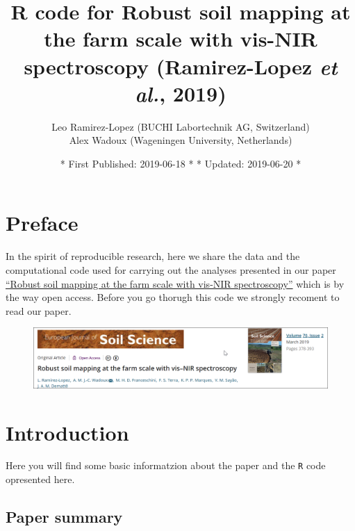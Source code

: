 \documentclass[]{book}
\title{R code for Robust soil mapping at the farm scale with vis-NIR spectroscopy (Ramirez-Lopez \emph{et al.}, 2019)}
\author{Leo Ramirez-Lopez (BUCHI Labortechnik AG, Switzerland) \\ Alex Wadoux (Wageningen University, Netherlands)}
\date{* First Published: 2019-06-18 * * Updated: 2019-06-20 *}
\begin{document}
\maketitle

{
\setcounter{tocdepth}{1}
\tableofcontents
}
\hypertarget{preface}{%
\chapter*{Preface}\label{preface}}

In the spirit of reproducible research, here we share the data and the computational code
used for carrying out the analyses presented in our paper \href{https://onlinelibrary.wiley.com/doi/10.1111/ejss.12752}{``Robust soil mapping at the farm scale with vis-NIR spectroscopy''} which is by the way open access. Before you go thorugh this code we strongly recoment to read our paper.

\begin{figure}
\includegraphics[width=0.9\linewidth]{./maps/paperimg} \end{figure}

\hypertarget{intro}{%
\chapter{Introduction}\label{intro}}

Here you will find some basic informatzion about the paper and the \texttt{R} code opresented here.

\hypertarget{paper-summary}{%
\section{Paper summary}\label{paper-summary}}
\end{document}
